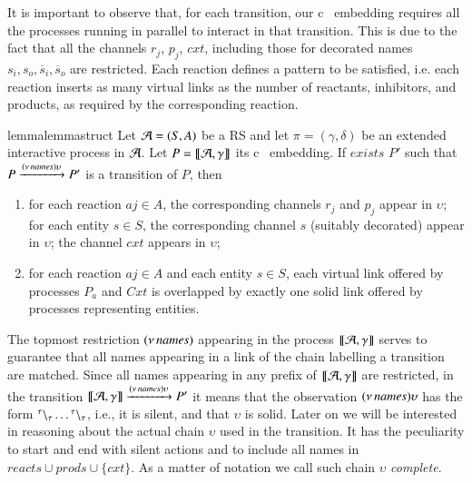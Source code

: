 It is important to observe that,   for each transition, our c\CNA \ 
{\color{red} embedding}
requires  all the processes 
running in parallel to  interact in that transition.
This is due to the fact that  all the channels $r_j$, $p_j$, $\mathit{cxt}$, including those for decorated names $s_{i},s_{o},\overline{s}_i,\overline{s}_o$ are  restricted.
Each reaction defines a pattern to be satisfied, i.e. each reaction inserts as many virtual links  as  the number of reactants, inhibitors, and products, as required by the corresponding reaction.

 \begin{restatable}[]{lemma}{lemmastruct}
 \label{lem:struct}
  Let ${\cal A} = (S, A)$ be a RS and let $\pi=(\gamma,\delta)$ be an extended  interactive process in ${\cal A}$. Let $P=\llbracket{\cal A},\gamma\rrbracket$ its c\CNA~{\color{red} embedding.}
  If $exists$ $P'$ such that $P \xrightarrow{(\nu\, \mathit{names})\upsilon} P'$ is a transition of $P$, then
  \begin{enumerate}
  \item for each reaction  $aj \in A$, the corresponding channels $r_j$ and $p_j$ appear in  $\upsilon$; for each entity $s \in S$, the corresponding channel $s$ (suitably decorated) appear in $\upsilon$; 
  the channel $\mathit{cxt}$ appears in $\upsilon$;
  \item for each reaction $aj \in A$ and each entity $s \in S$, each virtual link offered by processes $P_a$ and $\mathit{Cxt}$ is  overlapped by exactly one solid link offered by  processes representing entities.
  \end{enumerate}
  \end{restatable}

The topmost restriction $(\nu\, \mathit{names})$ appearing in the process $\llbracket{\cal A},\gamma\rrbracket$ serves to guarantee that all names appearing in a link of the chain labelling a transition are matched.
Since all names appearing in any prefix of $\llbracket{\cal A},\gamma\rrbracket$ are restricted, in the transition $\llbracket{\cal A},\gamma\rrbracket \xrightarrow{(\nu\, \mathit{names})\upsilon} P'$ it means that the observation $(\nu\, \mathit{names})\upsilon$ has the form ${}^{\tau} \backslash_{\tau}\dots{}^{\tau} \backslash_{\tau}$, i.e., it is silent, and that $\upsilon$ is solid. Later on we will be interested in reasoning about the actual chain $\upsilon$ used in the transition.  It has the peculiarity to start and end with silent actions and to include all names in $\mathit{reacts}\cup\mathit{prods}\cup\{\mathit{cxt}\}$. As a matter of notation we call such chain $\upsilon$ \emph{complete}. 

